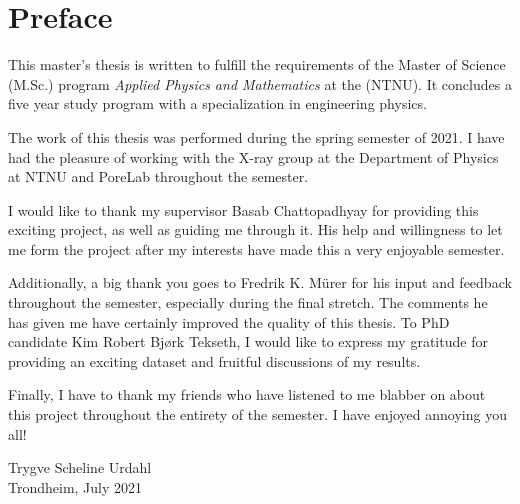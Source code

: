 \chapter*{Preface}
This master's thesis is written to fulfill the requirements of the Master of Science (M.Sc.) program \textit{Applied Physics and Mathematics} at the \NTNU (NTNU). It concludes a five year study program with a specialization in engineering physics. 

The work of this thesis was performed during the spring semester of 2021. I have had the pleasure of working with the X-ray group at the Department of Physics at NTNU and PoreLab throughout the semester. 

I would like to thank my supervisor Basab Chattopadhyay for providing this exciting project, as well as guiding me through it. His help and willingness to let me form the project after my interests have made this a very enjoyable semester.

Additionally, a big thank you goes to Fredrik K. Mürer for his input and feedback throughout the semester, especially during the final stretch. The comments he has given me have certainly improved the quality of this thesis. To PhD candidate Kim Robert Bjørk Tekseth, I would like to express my gratitude for providing an exciting dataset and fruitful discussions of my results. 

Finally, I have to thank my friends who have listened to me blabber on about this project throughout the entirety of the semester. I have enjoyed annoying you all! 

\begin{center}
    Trygve Scheline Urdahl \\[2pt]
    Trondheim, July 2021 
\end{center}